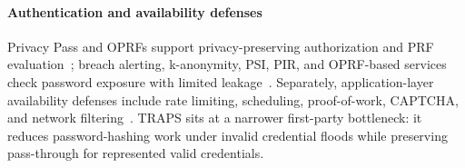 \paragraph{Authentication and availability defenses}
Privacy Pass and OPRFs support privacy-preserving authorization and PRF evaluation~\cite{RFC9576PPArch,RFC9577PPAuth,RFC9578PPIssuance,RFC9497OPRF}; breach alerting, k-anonymity, PSI, PIR, and OPRF-based services check password exposure with limited leakage~\cite{Thomas2019PasswordCheckup,Cloudflare2018KAnonHIBP,ChaseMiao2020PSIInternet,PaXoS2020,Lin2025UnbalancedPSI}. Separately, application-layer availability defenses include rate limiting, scheduling, proof-of-work, CAPTCHA, and network filtering~\cite{zargar2013survey,Dwork1992Pricing,vonAhn2003CAPTCHA,Ranjan2006DDoSResilientSched,Ranjan2009DDoSShield,Srivatsa2008AdmissionControlWeb}. TRAPS sits at a narrower first-party bottleneck: it reduces password-hashing work under invalid credential floods while preserving pass-through for represented valid credentials.
